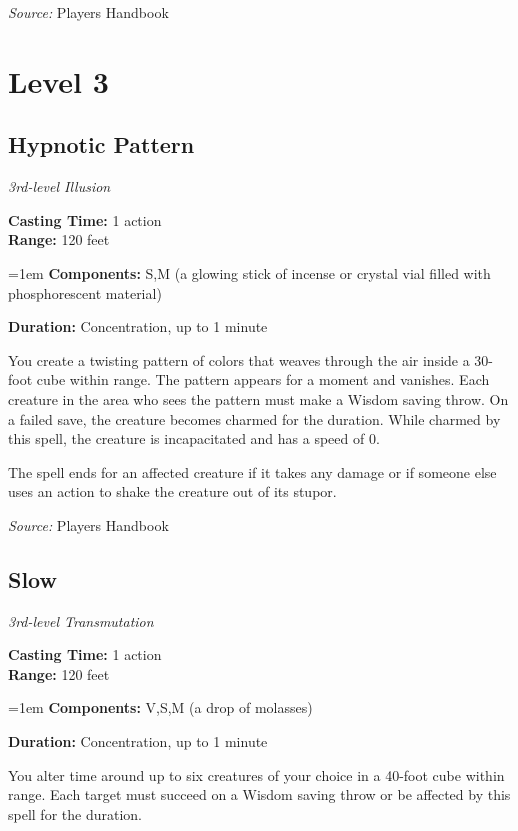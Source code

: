 \documentclass[10pt,twoside,twocolumn]{article}
\begin{document}
\textit{Source:} Players Handbook

\vfill
\section{Level 3}
\subsection{Hypnotic Pattern}
\textit{3rd-level Illusion}
\smallskip

\noindent
\textbf{Casting Time:}  1 action\\
\textbf{Range:}  120 feet

\noindent
\hangindent=1em
\textbf{Components:}  S,M (a glowing stick of incense or crystal vial filled with phosphorescent material)

\noindent
\textbf{Duration:}  Concentration, up to 1 minute\\
\smallskip



You create a twisting pattern of colors that weaves through the air inside a 30-foot cube within range. The pattern appears for a moment and vanishes. Each creature in the area who sees the pattern must make a Wisdom saving throw. On a failed save, the creature becomes charmed for the duration. While charmed by this spell, the creature is incapacitated and has a speed of 0.

The spell ends for an affected creature if it takes any damage or if someone else uses an action to shake the creature out of its stupor.



\textit{Source:} Players Handbook

\subsection{Slow}
\textit{3rd-level Transmutation}
\smallskip

\noindent
\textbf{Casting Time:}  1 action\\
\textbf{Range:}  120 feet

\noindent
\hangindent=1em
\textbf{Components:}  V,S,M (a drop of molasses)

\noindent
\textbf{Duration:}  Concentration, up to 1 minute\\
\smallskip



You alter time around up to six creatures of your choice in a 40-foot cube within range. Each target must succeed on a Wisdom saving throw or be affected by this spell for the duration.
\end{document}
